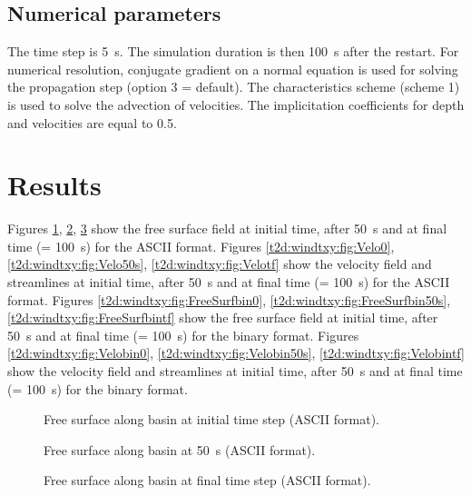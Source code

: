 \subsection{Numerical parameters}

The time step is 5~s. The simulation duration is then 100~s after the restart.
For numerical resolution, conjugate gradient on a normal equation 
is used for solving the propagation step (option 3 = default).
The characteristics scheme (scheme 1) is used to solve the advection of velocities.
The implicitation coefficients for depth and velocities are equal to 0.5.

\section{Results}

Figures \ref{t2d:windtxy:fig:FreeSurf0}, \ref{t2d:windtxy:fig:FreeSurf50s},
\ref{t2d:windtxy:fig:FreeSurftf} show the free surface field at initial time,
after 50~s and at final time (= 100~s) for the ASCII format.
Figures \ref{t2d:windtxy:fig:Velo0}, \ref{t2d:windtxy:fig:Velo50s},
\ref{t2d:windtxy:fig:Velotf} show the velocity field and streamlines
at initial time, after 50~s and at final time (= 100~s) for the ASCII format.
Figures \ref{t2d:windtxy:fig:FreeSurfbin0}, \ref{t2d:windtxy:fig:FreeSurfbin50s},
\ref{t2d:windtxy:fig:FreeSurfbintf} show the free surface field at initial time,
after 50~s and at final time (= 100~s) for the binary format.
Figures \ref{t2d:windtxy:fig:Velobin0}, \ref{t2d:windtxy:fig:Velobin50s},
\ref{t2d:windtxy:fig:Velobintf} show the velocity field and streamlines at
initial time, after 50~s and at final time (= 100~s) for the binary format.

\begin{figure}[H]
 \centering
 \caption{Free surface along basin at initial time step (ASCII format).}
 \label{t2d:windtxy:fig:FreeSurf0}
\end{figure}

\begin{figure}[H]
 \centering
 \caption{Free surface along basin at 50~s (ASCII format).}
 \label{t2d:windtxy:fig:FreeSurf50s}
\end{figure}

\begin{figure}[H]
 \centering
 \caption{Free surface along basin at final time step (ASCII format).}
 \label{t2d:windtxy:fig:FreeSurftf}
\end{figure}

